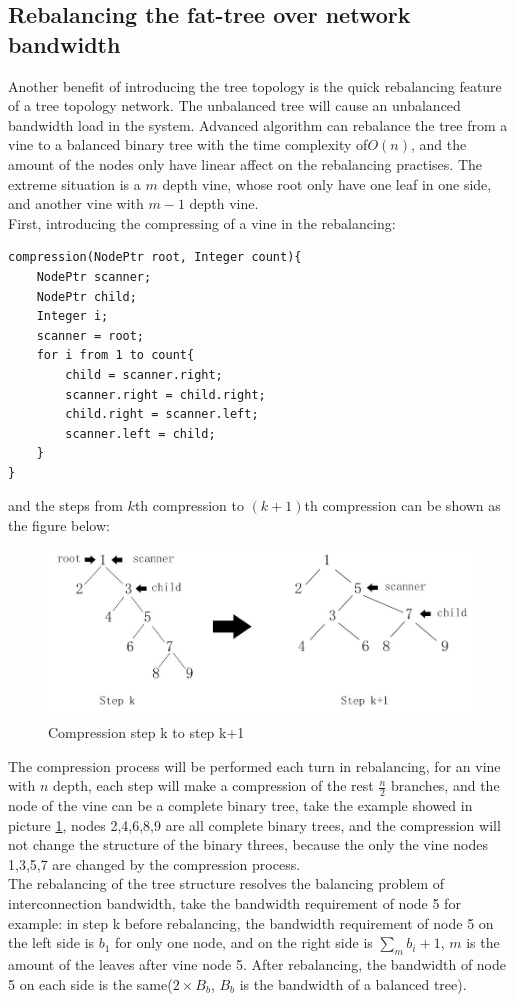 \documentclass[11pt,openright,a4paper]{report}
\begin{document}
\subsection{Rebalancing the fat-tree over network bandwidth}
Another benefit of introducing the tree topology is the quick rebalancing feature of a tree topology network. The unbalanced tree will cause an unbalanced bandwidth load in the system. Advanced algorithm can rebalance the tree from a vine to a balanced binary tree with the time complexity of$O(n)$, and the amount of the nodes only have linear affect on the rebalancing practises. The extreme situation is a $m$ depth vine, whose root only have one leaf in one side, and another vine with $m-1$ depth vine.\\  
First, introducing the compressing of a vine in the rebalancing:
\begin{lstlisting}[breaklines,breakatwhitespace,caption={Direct Data access from NIC to memory},label=compression-psudoCode]
compression(NodePtr root, Integer count){
	NodePtr scanner;
	NodePtr child;
	Integer i;
	scanner = root;
	for i from 1 to count{
		child = scanner.right;
		scanner.right = child.right;
		child.right = scanner.left;
		scanner.left = child;
    }
}
\end{lstlisting}
and the steps from $k$th compression to $(k+1)$th compression can be shown as the figure below:
\begin{figure}[H]
	\centering
    \includegraphics[width=0.6\linewidth]{picture/compression.JPG}
    \caption{Compression step k to step k+1}
    \label{fig:compression}
\end{figure}
The compression process will be performed each turn in rebalancing, for an vine with $n$ depth, each step will make a compression of the rest $\frac{n}{2}$ branches, and the node of the vine can be a complete binary tree, take the example showed in picture \ref{fig:compression}, nodes 2,4,6,8,9 are all complete binary trees, and the compression will not change the structure of the binary threes, because the only the vine nodes 1,3,5,7 are changed by the compression process\cite{stout1986tree}.\\
The rebalancing of the tree structure resolves the balancing problem of interconnection bandwidth, take the bandwidth requirement of node 5 for example: in step k before rebalancing, the bandwidth requirement of node 5 on the left side is $b_{1}$ for only one node, and on the right side is $\sum_{m}b_{i}+1$, $m$ is the amount of the leaves after vine node 5. After rebalancing, the bandwidth of node 5 on each side is the same($2\times B_{b}$, $B_{b}$ is the bandwidth of a balanced tree).\\ 
\end{document}
